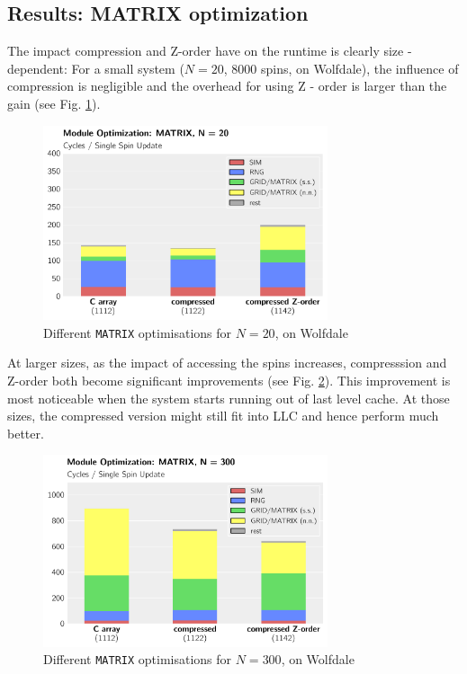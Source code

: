 \documentclass[letterpaper]{article}
\begin{document}
\subsection{Results: MATRIX optimization}
The impact compression and Z-order have on the runtime is clearly size - dependent: For a small system ($N = 20$, $8000$ spins, on Wolfdale), the influence of compression is negligible and the overhead for using Z - order is larger than the gain (see Fig. \ref{MATRIX:Wolf:20}).
	\begin{figure}[h]\centering
	  \includegraphics[width = 8.36cm]{plots/msk_20_3.pdf}
	  \caption{Different \texttt{MATRIX} optimisations for $N = 20$, on Wolfdale}
	  \label{MATRIX:Wolf:20}
	\end{figure}\newline
At larger sizes, as the impact of accessing the spins increases, compresssion and Z-order both become significant improvements (see Fig. \ref{MATRIX:Wolf:300}). This improvement is most noticeable when the system starts running out of last level cache. At those sizes, the compressed version might still fit into LLC and hence perform much better.
	\begin{figure}[h]\centering
	  \includegraphics[width = 8.36cm]{plots/msk_300_3.pdf}
	  \caption{Different \texttt{MATRIX} optimisations for $N = 300$, on Wolfdale}
	  \label{MATRIX:Wolf:300}
	\end{figure}\newline
\end{document}
